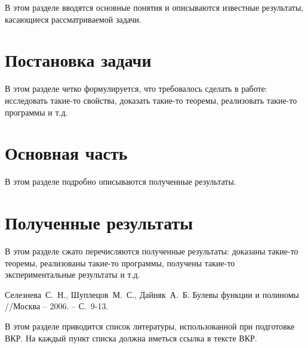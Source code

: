 \documentclass[a4paper,12pt,titlepage]{article}
\begin{document}
В этом разделе вводятся основные понятия и описываются известные результаты, касающиеся рассматриваемой задачи.

\section{Постановка задачи}

В этом разделе четко формулируется, что требовалось сделать в работе: исследовать такие-то свойства, доказать такие-то теоремы, реализовать такие-то программы и т.д.

\section{Основная часть}

В этом разделе подробно описываются полученные результаты.

\section{Полученные результаты}

В этом разделе сжато перечисляются полученные результаты: доказаны такие-то теоремы, реализованы такие-то программы, получены такие-то экспериментальные результаты и т.д.

\begin{raggedright}
\begin{thebibliography}{99}
     Селезнева~С.~Н., Шуплецов~М.~С., Дайняк~А.~Б. Булевы функции и полиномы //Москва – 2006. – С.~9-13.
\end{thebibliography}
В этом разделе приводится список литературы, использованной при подготовке ВКР. На каждый пункт списка должна иметься ссылка в тексте ВКР.
\end{raggedright}
\end{document}
